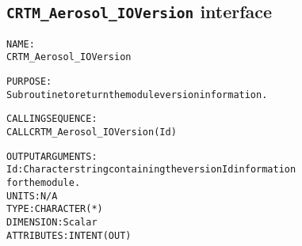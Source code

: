 \subsection{\texttt{CRTM\_Aerosol\_IOVersion} interface}
  \label{sec:CRTM_Aerosol_IOVersion_interface}
  \begin{alltt}
 
  NAME:
        CRTM_Aerosol_IOVersion
 
  PURPOSE:
        Subroutine to return the module version information.
 
  CALLING SEQUENCE:
        CALL CRTM_Aerosol_IOVersion( Id )
 
  OUTPUT ARGUMENTS:
        Id:   Character string containing the version Id information
              for the module.
              UNITS:      N/A
              TYPE:       CHARACTER(*)
              DIMENSION:  Scalar
              ATTRIBUTES: INTENT(OUT)
 
  \end{alltt}

